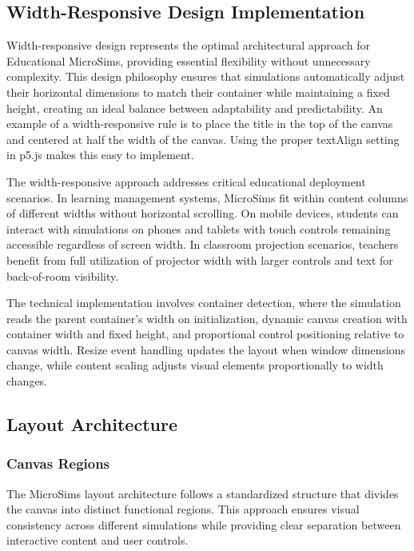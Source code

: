 \subsection{Width-Responsive Design Implementation}

Width-responsive design represents the optimal architectural approach for Educational MicroSims, providing essential flexibility without unnecessary complexity. This design philosophy ensures that simulations automatically adjust their horizontal dimensions to match their container while maintaining a fixed height, creating an ideal balance between adaptability and predictability.  An example of a width-responsive rule is to place the title in the top of the canvas and centered at half the width of the canvas.  Using the proper textAlign setting in p5.js makes this easy to implement.

The width-responsive approach addresses critical educational deployment scenarios. In learning management systems, MicroSims fit within content columns of different widths without horizontal scrolling. On mobile devices, students can interact with simulations on phones and tablets with touch controls remaining accessible regardless of screen width. In classroom projection scenarios, teachers benefit from full utilization of projector width with larger controls and text for back-of-room visibility.

The technical implementation involves container detection, where the simulation reads the parent container's width on initialization, dynamic canvas creation with container width and fixed height, and proportional control positioning relative to canvas width. Resize event handling updates the layout when window dimensions change, while content scaling adjusts visual elements proportionally to width changes.

\subsection{Layout Architecture}

\subsubsection{Canvas Regions}

The MicroSims layout architecture follows a standardized structure that divides the canvas into distinct functional regions. This approach ensures visual consistency across different simulations while providing clear separation between interactive content and user controls.

